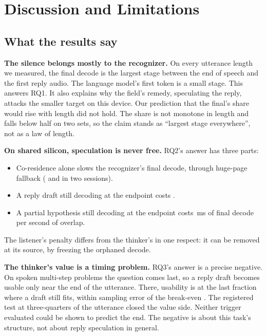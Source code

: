 \chapter{Discussion and Limitations}
\label{ch:discussion}

\section{What the results say}
\label{sec:what}

\textbf{The silence belongs mostly to the recognizer.} On every utterance
length we measured, the final decode is the largest stage between the end of
speech and the first reply audio. The language model's first token is a small
stage. This answers RQ1. It also explains why the field's remedy, speculating
the reply, attacks the smaller target on this device. Our prediction that the
final's share would rise with length did not hold. The share is not monotone
in length and falls below half on two sets, so the claim stands as ``largest
stage everywhere'', not as a law of length.

\textbf{On shared silicon, speculation is never free.} RQ2's answer has three
parts:
\begin{itemize}
\item Co-residence alone slows the recognizer's final decode, through
  huge-page fallback (\TaxBallastA{} and \TaxBallastB{} in two sessions).
\item A reply draft still decoding at the endpoint costs \ThinkerOverlap.
\item A partial hypothesis still decoding at the endpoint costs \ListenerC\,ms
  of final decode per second of overlap.
\end{itemize}
The listener's penalty differs from the thinker's in one respect: it can be
removed at its source, by freezing the orphaned decode.

\textbf{The thinker's value is a timing problem.} RQ3's answer is a precise
negative. On spoken multi-step problems the question comes last, so a reply
draft becomes usable only near the end of the utterance. There, usability is
\FstarUsable{} at the last fraction where a draft still fits, within sampling
error of the break-even \BreakEven. The registered test at three-quarters of
the utterance closed the value side. Neither trigger evaluated could be shown
to predict the end. The negative is about this task's structure, not about
reply speculation in general.

